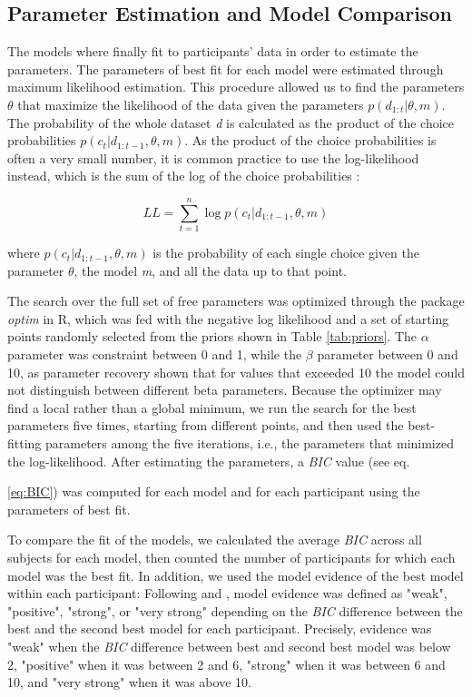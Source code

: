 \documentclass[a4paper,12pt]{article}
\begin{document}
\subsection{Parameter Estimation and Model Comparison}
The models where finally fit to participants' data in order to estimate the parameters. The parameters of best fit for each model were estimated through maximum likelihood estimation. This procedure allowed us to find the parameters $\theta$ that maximize the likelihood of the data given the parameters $p(d_{1:t} | \theta, m )$. 
The probability of the whole dataset \textit{d} is calculated as the product of the choice probabilities $p(c_t | d_{1:t-1}, \theta, m)$. As the product of the choice probabilities is often a very small number, it is common practice to use the log-likelihood instead, which is the sum of the log of the choice probabilities \cite{Daw2011, Wilson2019a}:

\begin{equation}
LL = \sum_{t=1}^{n} \log{p(c_t | d_{1:t-1} , \theta, m)}
\end{equation}

\noindent
where $p(c_t | d_{1:t-1}, \theta, m)$ is the probability of each single choice given the parameter $\theta$, the model \textit{m}, and all the data up to that point. \par
The search over the full set of free parameters was optimized through the package \textit{optim} in R, which was fed with the negative log likelihood and a set of starting points randomly selected from the priors shown in Table \ref{tab:priors}. The $\alpha$ parameter was constraint between 0 and 1, while the $\beta$ parameter between 0 and 10, as parameter recovery shown that for values that exceeded 10 the model could not distinguish between different beta parameters. Because the optimizer may find a local rather than a global minimum, we run the search for the best parameters five times, starting from different points, and then used the best-fitting parameters among the five iterations, i.e., the parameters that minimized the log-likelihood. 
After estimating the parameters, a \textit{BIC} value (see eq.\usepackage{} \ref{eq:BIC}) was computed for each model and for each participant using the parameters of best fit. \par
To compare the fit of the models, we calculated the average \textit{BIC} across all subjects for each model, then counted the number of participants for which each model was the best fit. In addition, we used the model evidence of the best model within each participant: Following \cite{raftery1995bayesian} and \cite{gluth2017attraction}, model evidence was defined as "weak", "positive", "strong", or "very strong" depending on the \textit{BIC} difference between the best and the second best model for each participant. Precisely, evidence was "weak" when the \textit{BIC} difference between best and second best model was below 2, "positive" when it was between 2 and 6, "strong" when it was between 6 and 10, and "very strong" when it was above 10. 
\end{document}
